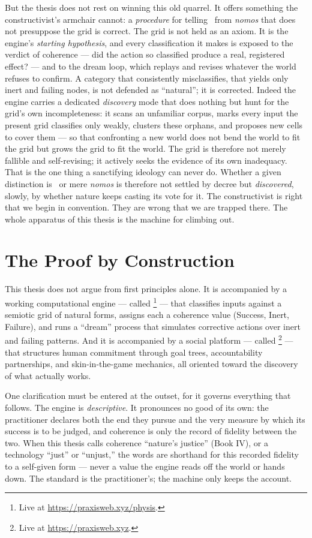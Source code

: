 But the thesis does not rest on winning this old quarrel. It offers something the
constructivist's armchair cannot: a \emph{procedure} for telling \physis\ from
\emph{nomos} that does not presuppose the grid is correct. The grid is not held as
an axiom. It is the engine's \emph{starting hypothesis}, and every classification
it makes is exposed to the verdict of coherence --- did the action so classified
produce a real, registered effect? --- and to the dream loop, which replays and
revises whatever the world refuses to confirm. A category that consistently
misclassifies, that yields only inert and failing nodes, is not defended as
``natural''; it is corrected. Indeed the engine carries a dedicated
\emph{discovery} mode that does nothing but hunt for the grid's own
incompleteness: it scans an unfamiliar corpus, marks every input the present grid
classifies only weakly, clusters these orphans, and proposes new cells to cover
them --- so that confronting a new world does not bend the world to fit the grid
but grows the grid to fit the world. The grid is therefore not merely fallible and
self-revising; it actively seeks the evidence of its own inadequacy. That is the
one thing a sanctifying ideology can never do. Whether
a given distinction is \physis\ or mere \emph{nomos} is therefore not settled by
decree but \emph{discovered}, slowly, by whether nature keeps casting its vote for
it. The constructivist is right that we begin in convention. They are wrong that
we are trapped there. The whole apparatus of this thesis is the machine for
climbing out.

\section{The Proof by Construction}

This thesis does not argue from first principles alone. It is accompanied by a
working computational engine --- called \physis\footnote{Live at
\url{https://praxisweb.xyz/physis}.} --- that classifies inputs against
a semiotic grid of natural forms, assigns each a coherence value (Success,
Inert, Failure), and runs a ``dream'' process that simulates corrective actions
over inert and failing patterns. And it is accompanied by a social platform ---
called \praxis\footnote{Live at \url{https://praxisweb.xyz}.} --- that structures human commitment through goal trees,
accountability partnerships, and skin-in-the-game mechanics, all oriented toward
the discovery of what actually works.

One clarification must be entered at the outset, for it governs everything that
follows. The engine is \emph{descriptive}. It pronounces no good of its own: the
practitioner declares both the end they pursue and the very measure by which its
success is to be judged, and coherence is only the record of fidelity between the
two. When this thesis calls coherence ``nature's justice'' (Book IV), or a
technology ``just'' or ``unjust,'' the words are shorthand for this recorded
fidelity to a self-given form --- never a value the engine reads off the world or
hands down. The standard is the practitioner's; the machine only keeps the account.

